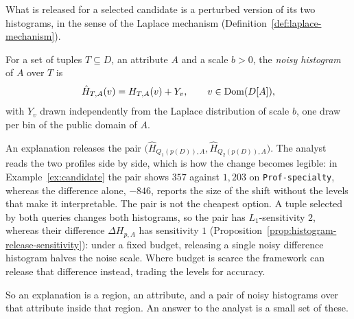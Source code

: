 What is released for a selected candidate is a perturbed version of its two histograms, in the sense of the Laplace mechanism (Definition~\ref{def:laplace-mechanism}).

\begin{definition}
\label{def:noisy-histogram}
For a set of tuples $T\subseteq D$, an attribute $A$ and a scale $b>0$, the \emph{noisy histogram} of $A$ over $T$ is
\[
\hat H_{T,A}(v)=H_{T,A}(v)+Y_v,\qquad v\in\operatorname{Dom}(D[A]),
\]
with $Y_v$ drawn independently from the Laplace distribution of scale $b$, one draw per bin of the public domain of $A$.
\end{definition}

An explanation releases the pair $\big(\hat H_{Q_1(p(D)),A},\hat H_{Q_2(p(D)),A}\big)$.
The analyst reads the two profiles side by side, which is how the change becomes legible: in Example~\ref{ex:candidate} the pair shows $357$ against $1{,}203$ on \texttt{Prof-specialty}, whereas the difference alone, $-846$, reports the size of the shift without the levels that make it interpretable.
The pair is not the cheapest option.
A tuple selected by both queries changes both histograms, so the pair has $L_1$-sensitivity $2$, whereas their difference $\Delta H_{p,A}$ has sensitivity $1$ (Proposition~\ref{prop:histogram-release-sensitivity}): under a fixed budget, releasing a single noisy difference histogram halves the noise scale.
Where budget is scarce the framework can release that difference instead, trading the levels for accuracy.


So an explanation is a region, an attribute, and a pair of noisy histograms over that attribute inside that region.
An answer to the analyst is a small set of these.

